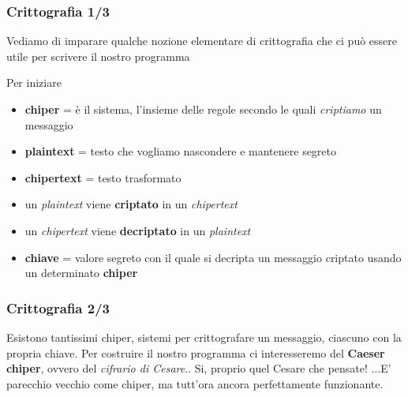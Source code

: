 \documentclass{beamer}
\begin{document}
\begin{frame}[fragile]
\frametitle{Crittografia 1/3}
Vediamo di imparare qualche nozione elementare di crittografia che ci può essere utile per scrivere il nostro programma
\begin{block}{Per iniziare}
	\begin{itemize}
		\item \textbf{chiper} = è il sistema, l'insieme delle regole secondo le quali \textit{criptiamo} un messaggio
		\item \textbf{plaintext} = testo che vogliamo nascondere e mantenere segreto
		\item \textbf{chipertext} = testo trasformato
		\item un \textit{plaintext} viene \textbf{criptato} in un \textit{chipertext}
		\item un \textit{chipertext} viene \textbf{decriptato} in un \textit{plaintext}
		\item \textbf{chiave} = valore segreto con il quale si decripta un messaggio criptato usando un determinato \textbf{chiper}
	\end{itemize}
\end{block}
    
\end{frame}

\begin{frame}[fragile]
\frametitle{Crittografia 2/3}
Esistono tantissimi chiper, sistemi per crittografare un messaggio, ciascuno con la propria chiave. Per costruire il nostro programma ci interesseremo del \textbf{Caeser chiper}, ovvero del \textit{cifrario di Cesare}.. Si, proprio quel Cesare che pensate! ...E' parecchio vecchio come chiper, ma tutt'ora ancora perfettamente funzionante.

\end{frame}
\end{document}

